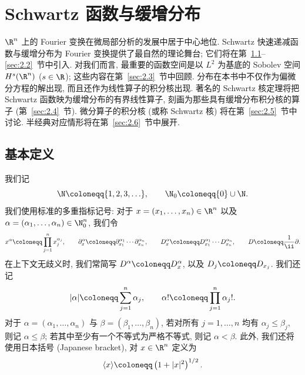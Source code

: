 
\chapter{Schwartz 函数与缓增分布}\label{ch:02}

$\R^n$ 上的 Fourier 变换在微局部分析的发展中居于中心地位. Schwartz 快速递减函数与缓增分布为 Fourier 变换提供了最自然的理论舞台; 它们将在第~\ref{sec:2.1}--\ref{sec:2.2}~节中引入. 对我们而言, 最重要的函数空间是以 $L^2$ 为基底的 Sobolev 空间 $H^s(\R^n)$ ($s \in \R$); 这些内容在第~\ref{sec:2.3}~节中回顾. 分布在本书中不仅作为偏微分方程的解出现, 而且还作为线性算子的积分核出现. 著名的 Schwartz 核定理将把 Schwartz 函数映为缓增分布的有界线性算子, 刻画为那些具有缓增分布积分核的算子 (第~\ref{sec:2.4}~节). 微分算子的积分核 (或称 Schwartz 核) 将在第~\ref{sec:2.5}~节中讨论. 半经典对应情形将在第~\ref{sec:2.6}~节中展开.

\section{基本定义}\label{sec:2.1}
%
%

我们记
\begin{equation}\label{eq:2.1}
    \N \defeq \{1, 2, 3, \ldots\}, \qquad \N_0 \defeq \{0\} \cup \N.
\end{equation}
我们使用标准的多重指标记号: 对于 $x = (x_1, \ldots, x_n) \in \R^n$ 以及 $\alpha = (\alpha_1, \ldots, \alpha_n) \in \N_0^n$, 我们令
\begin{equation}\label{eq:2.2}
    x^\alpha \defeq \prod_{j=1}^n x_j^{\alpha_j}, \qquad
    \partial_x^\alpha \defeq \partial_{x_1}^{\alpha_1} \cdots \partial_{x_n}^{\alpha_n}, \qquad
    D_x^\alpha \defeq D_{x_1}^{\alpha_1} \cdots D_{x_n}^{\alpha_n}, \qquad
    D \defeq \frac{1}{\ii} \partial.
\end{equation}
在上下文无歧义时, 我们常简写 $D^\alpha \defeq D_x^\alpha$, 以及 $D_j \defeq D_{x_j}$. 我们还记
\begin{equation}\label{eq:2.3}
    |\alpha| \defeq \sum_{j=1}^n \alpha_j, \qquad \alpha! \defeq \prod_{j=1}^n \alpha_j!.
\end{equation}
对于 $\alpha = (\alpha_1, \ldots, \alpha_n)$ 与 $\beta = (\beta_1, \ldots, \beta_n)$, 若对所有 $j = 1, \ldots, n$ 均有 $\alpha_j \le \beta_j$, 则记 $\alpha \le \beta$; 若其中至少有一个不等式为严格不等式, 则记 $\alpha < \beta$. 此外, 我们还将使用日本括号 (Japanese bracket), 对 $x \in \R^n$ 定义为
\begin{equation}\label{eq:2.4}
    \langle x \rangle \defeq \left( 1 + |x|^2 \right)^{1/2}.
\end{equation}


